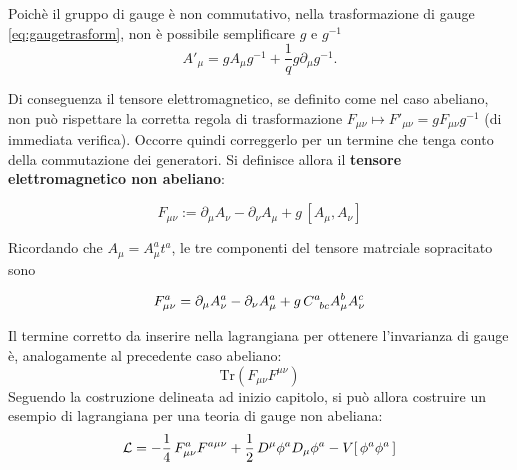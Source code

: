 Poichè il gruppo di gauge è non commutativo, nella trasformazione di gauge
\ref{eq:gaugetrasform}, non è possibile semplificare $g$ e $g^{-1}$
$$
   A'_\mu = g A_\mu g^{-1} + \frac{1}{q} g \partial _\mu g^ {-1}.
$$

Di conseguenza il tensore elettromagnetico, se definito come nel caso abeliano,
non può rispettare la corretta regola di trasformazione $F_{\mu\nu}
\mapsto F'_{\mu\nu} = g F_{\mu\nu} g^{-1}$ (di immediata verifica). Occorre quindi
correggerlo per un termine che tenga conto della commutazione dei generatori. Si
definisce allora il \textbf{tensore elettromagnetico non abeliano}:

\begin{equation}
   F _{\mu\nu} := \partial _\mu A_\nu - \partial _\nu A_\mu + g \, [A_\mu,A_\nu]
\end{equation}

Ricordando che $ A_\mu = A^a_\mu t^a $, le tre componenti del tensore matrciale sopracitato
sono

\begin{equation}
   F_{\mu\nu}^a = \partial _\mu A^a_\nu
       - \partial _\nu A^a_\mu + g \,C^{a}_{\hphantom{a}bc} A^b_\mu A^c_\nu
\end{equation}

Il termine corretto da inserire nella lagrangiana per ottenere l'invarianza di gauge
è, analogamente al precedente caso abeliano:
$$
   \mathrm{Tr}(F_{\mu\nu}F^{\mu\nu})
$$
Seguendo la costruzione delineata ad inizio capitolo, si può allora costruire
un esempio di lagrangiana per una teoria di gauge non abeliana:
\begin{equation}\label{eq:nonabelianlagrangian}
  \mathcal{L} = -\frac{1}{4} \, F^a_{\mu\nu}F^{a\mu\nu}
        + \frac{1}{2} \, D^\mu \phi^a D_\mu \phi^a
        - V[\, \phi^a \phi^a \,]
\end{equation}\\


